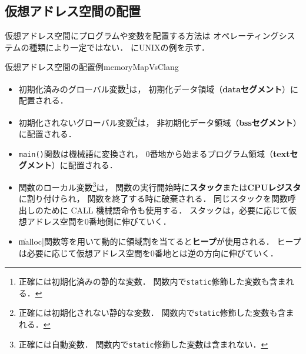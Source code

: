\subsection{仮想アドレス空間の配置}
仮想アドレス空間にプログラムや変数を配置する方法は
オペレーティングシステムの種類により一定ではない．
にUNIXの例を示す．

{仮想アドレス空間の配置例}{memoryMapVsClang}

\begin{itemize}
\item 初期化済みのグローバル変数\footnote{
正確には初期化済みの静的な変数．
関数内で{\tt static}修飾した変数も含まれる．}は，
初期化データ領域（{\bf dataセグメント}）に配置される．
\item 初期化されないグローバル変数\footnote{
正確には初期化されない静的な変数．
関数内で{\tt static}修飾した変数も含まれる．}は，
非初期化データ領域（{\bf bssセグメント}）に配置される．
\item {\tt main()}関数は機械語に変換され，
0番地から始まるプログラム領域（{\bf textセグメント}）に配置される．
\item 関数のローカル変数\footnote{
正確には自動変数．
関数内で{\tt static}修飾した変数は含まれない．}は，
関数の実行開始時に{\bf スタック}または{\bf CPUレジスタ}に割り付けられ，
関数を終了する時に破棄される．
同じスタックを関数呼出しのために CALL 機械語命令も使用する．
スタックは，必要に応じて仮想アドレス空間を0番地側に伸びていく．
\item \|malloc|関数等を用いて動的に領域割を当てると{\bf ヒープ}が使用される．
ヒープは必要に応じて仮想アドレス空間を0番地とは逆の方向に伸びていく．
\end{itemize}

\begin{figure}
\begin{quote}

\end{quote}
\end{figure}
